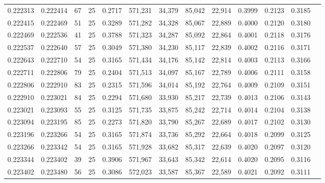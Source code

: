 \begin{tabular}{rrrrrrrrrrrrr}
0.222313 & 0.222414 &    67 &  25 &                                     0.2717 & 571,231 &  34,379 &  85,042 &  22,914 & 0.3999 & 0.2123 & 0.3185 \\
0.222415 & 0.222469 &    51 &  25 &                                     0.3289 & 571,282 &  34,328 &  85,067 &  22,889 & 0.4000 & 0.2120 & 0.3180 \\
0.222469 & 0.222536 &    41 &  25 &                                     0.3788 & 571,323 &  34,287 &  85,092 &  22,864 & 0.4001 & 0.2118 & 0.3176 \\
0.222537 & 0.222640 &    57 &  25 &                                     0.3049 & 571,380 &  34,230 &  85,117 &  22,839 & 0.4002 & 0.2116 & 0.3171 \\
0.222643 & 0.222710 &    54 &  25 &                                     0.3165 & 571,434 &  34,176 &  85,142 &  22,814 & 0.4003 & 0.2113 & 0.3166 \\
0.222711 & 0.222806 &    79 &  25 &                                     0.2404 & 571,513 &  34,097 &  85,167 &  22,789 & 0.4006 & 0.2111 & 0.3158 \\
0.222806 & 0.222910 &    83 &  25 &                                     0.2315 & 571,596 &  34,014 &  85,192 &  22,764 & 0.4009 & 0.2109 & 0.3151 \\
0.222910 & 0.223021 &    84 &  25 &                                     0.2294 & 571,680 &  33,930 &  85,217 &  22,739 & 0.4013 & 0.2106 & 0.3143 \\
0.223021 & 0.223093 &    55 &  25 &                                     0.3125 & 571,735 &  33,875 &  85,242 &  22,714 & 0.4014 & 0.2104 & 0.3138 \\
0.223094 & 0.223195 &    85 &  25 &                                     0.2273 & 571,820 &  33,790 &  85,267 &  22,689 & 0.4017 & 0.2102 & 0.3130 \\
0.223196 & 0.223266 &    54 &  25 &                                     0.3165 & 571,874 &  33,736 &  85,292 &  22,664 & 0.4018 & 0.2099 & 0.3125 \\
0.223266 & 0.223342 &    54 &  25 &                                     0.3165 & 571,928 &  33,682 &  85,317 &  22,639 & 0.4020 & 0.2097 & 0.3120 \\
0.223344 & 0.223402 &    39 &  25 &                                     0.3906 & 571,967 &  33,643 &  85,342 &  22,614 & 0.4020 & 0.2095 & 0.3116 \\
0.223402 & 0.223480 &    56 &  25 &                                     0.3086 & 572,023 &  33,587 &  85,367 &  22,589 & 0.4021 & 0.2092 & 0.3111 \\

\end{tabular}
